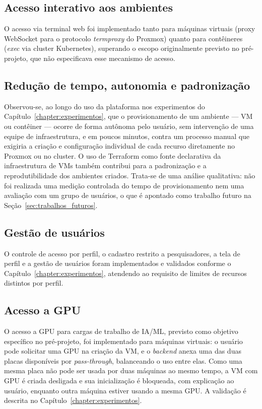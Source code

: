 \subsection{Acesso interativo aos ambientes}
O acesso via terminal web foi implementado tanto para máquinas virtuais (proxy WebSocket para o protocolo \textit{termproxy} do Proxmox) quanto para contêineres (\textit{exec} via cluster Kubernetes), superando o escopo originalmente previsto no pré-projeto, que não especificava esse mecanismo de acesso.

\subsection{Redução de tempo, autonomia e padronização}
Observou-se, ao longo do uso da plataforma nos experimentos do Capítulo~\ref{chapter:experimentos}, que o provisionamento de um ambiente — VM ou contêiner — ocorre de forma autônoma pelo usuário, sem intervenção de uma equipe de infraestrutura, e em poucos minutos, contra um processo manual que exigiria a criação e configuração individual de cada recurso diretamente no Proxmox ou no cluster. O uso de Terraform como fonte declarativa da infraestrutura de VMs também contribui para a padronização e a reprodutibilidade dos ambientes criados. Trata-se de uma análise qualitativa: não foi realizada uma medição controlada do tempo de provisionamento nem uma avaliação com um grupo de usuários, o que é apontado como trabalho futuro na Seção~\ref{sec:trabalhos_futuros}.

\subsection{Gestão de usuários}
O controle de acesso por perfil, o cadastro restrito a pesquisadores, a tela de perfil e a gestão de usuários foram implementados e validados conforme o Capítulo~\ref{chapter:experimentos}, atendendo ao requisito de limites de recursos distintos por perfil.

\subsection{Acesso a GPU}
O acesso a GPU para cargas de trabalho de IA/ML, previsto como objetivo específico no pré-projeto, foi implementado para máquinas virtuais: o usuário pode solicitar uma GPU na criação da VM, e o \textit{backend} anexa uma das duas placas disponíveis por \textit{pass-through}, balanceando o uso entre elas. Como uma mesma placa não pode ser usada por duas máquinas ao mesmo tempo, a VM com GPU é criada desligada e sua inicialização é bloqueada, com explicação ao usuário, enquanto outra máquina estiver usando a mesma GPU. A validação é descrita no Capítulo~\ref{chapter:experimentos}.
